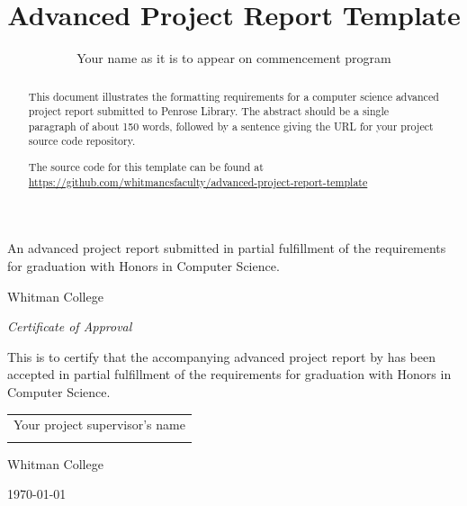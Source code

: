 \documentclass{article}
\title{Advanced Project Report Template}
\author{Your name as it is to appear on commencement program}
\date{}
\newcommand{\supervisor}{Your project supervisor's name}
\begin{document}
\begin{titlepage}

\maketitle %

\begin{centering}

An advanced project report submitted in partial fulfillment of the
requirements for graduation with Honors in Computer Science.

\vfill %

Whitman College

\the\year

\end{centering}
\end{titlepage}




\begin{titlepage} %
\begin{centering}

\textit{Certificate of Approval}

\vspace{0.5in}

This is to certify that the accompanying advanced project report by \textbf{\theauthor} has been accepted in partial fulfillment of the requirements for graduation with Honors in Computer Science.

\end{centering}

\vspace{1in}

\hfill
\renewcommand{\arraystretch}{1.5}
\begin{tabular}{c}
\hline
\supervisor \\
\hspace{2in}
\end{tabular}

\vfill
Whitman College

\today
\end{titlepage}




\begin{abstract}
This document illustrates the formatting requirements for a computer science advanced project report submitted to Penrose Library. The abstract should be a single paragraph of about 150 words, followed by a sentence giving the URL for your project source code repository.

The source code for this template can be found at
\url{https://github.com/whitmancsfaculty/advanced-project-report-template}
\end{abstract}
\end{document}
